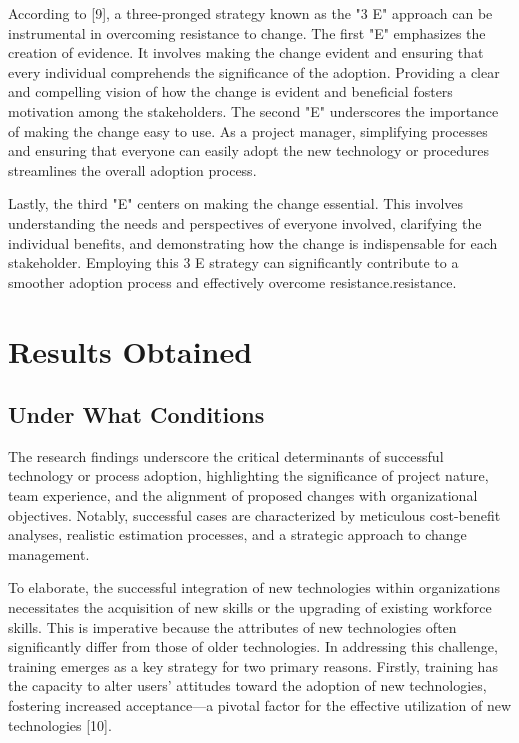 \documentclass{article}
\begin{document}
\noindent According to [9], a three-pronged strategy known as the "3 E" approach can be instrumental in overcoming resistance to change. The first "E" emphasizes the creation of evidence. It involves making the change evident and ensuring that every individual comprehends the significance of the adoption. Providing a clear and compelling vision of how the change is evident and beneficial fosters motivation among the stakeholders. The second "E" underscores the importance of making the change easy to use. As a project manager, simplifying processes and ensuring that everyone can easily adopt the new technology or procedures streamlines the overall adoption process. \newline

\noindent Lastly, the third "E" centers on making the change essential. This involves understanding the needs and perspectives of everyone involved, clarifying the individual benefits, and demonstrating how the change is indispensable for each stakeholder. Employing this 3 E strategy can significantly contribute to a smoother adoption process and effectively overcome resistance.resistance.

\section{Results Obtained}
\subsection{Under What Conditions}
The research findings underscore the critical determinants of successful technology or process adoption, highlighting the significance of project nature, team experience, and the alignment of proposed changes with organizational objectives. Notably, successful cases are characterized by meticulous cost-benefit analyses, realistic estimation processes, and a strategic approach to change management. \newline

\noindent To elaborate, the successful integration of new technologies within organizations necessitates the acquisition of new skills or the upgrading of existing workforce skills. This is imperative because the attributes of new technologies often significantly differ from those of older technologies. In addressing this challenge, training emerges as a key strategy for two primary reasons. Firstly, training has the capacity to alter users' attitudes toward the adoption of new technologies, fostering increased acceptance—a pivotal factor for the effective utilization of new technologies [10].
\end{document}
